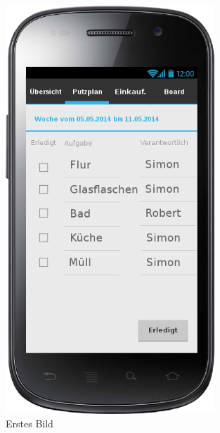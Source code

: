 \begin{figure}[htbp] 
  \centering
     \includegraphics[width=0.7\textwidth]{anhang/mockups/putzplanneuewoche.png}
  \caption{Erstes Bild}
  \label{fig:Bild1}
\end{figure}

